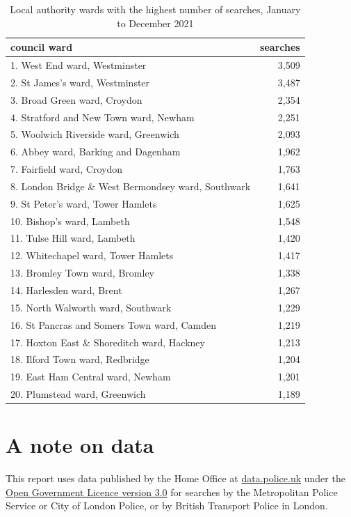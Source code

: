 \documentclass[
  a4paper,
  twoside, 11pt]{article}
\begin{document}
\begin{table}

\caption{\label{tab:table-ward}Local authority wards with the highest number of searches, January to December 2021}
\centering
\begin{tabular}[t]{lr}
\toprule
council ward & searches\\
\midrule
1. West End ward, Westminster & 3,509\\
2. St James's ward, Westminster & 3,487\\
3. Broad Green ward, Croydon & 2,354\\
4. Stratford and New Town ward, Newham & 2,251\\
5. Woolwich Riverside ward, Greenwich & 2,093\\
6. Abbey ward, Barking and Dagenham & 1,962\\
7. Fairfield ward, Croydon & 1,763\\
8. London Bridge \& West Bermondsey ward, Southwark & 1,641\\
9. St Peter's ward, Tower Hamlets & 1,625\\
10. Bishop's ward, Lambeth & 1,548\\
11. Tulse Hill ward, Lambeth & 1,420\\
12. Whitechapel ward, Tower Hamlets & 1,417\\
13. Bromley Town ward, Bromley & 1,338\\
14. Harlesden ward, Brent & 1,267\\
15. North Walworth ward, Southwark & 1,229\\
16. St Pancras and Somers Town ward, Camden & 1,219\\
17. Hoxton East \& Shoreditch ward, Hackney & 1,213\\
18. Ilford Town ward, Redbridge & 1,204\\
19. East Ham Central ward, Newham & 1,201\\
20. Plumstead ward, Greenwich & 1,189\\
\bottomrule
\end{tabular}
\end{table}

\hypertarget{a-note-on-data}{%
\section{A note on data}\label{a-note-on-data}}

This report uses data published by the Home Office at \href{https://data.police.uk/}{data.police.uk} under the \href{https://www.nationalarchives.gov.uk/doc/open-government-licence/version/3/}{Open Government Licence version 3.0} for searches by the Metropolitan Police Service or City of London Police, or by British Transport Police in London.
\end{document}
